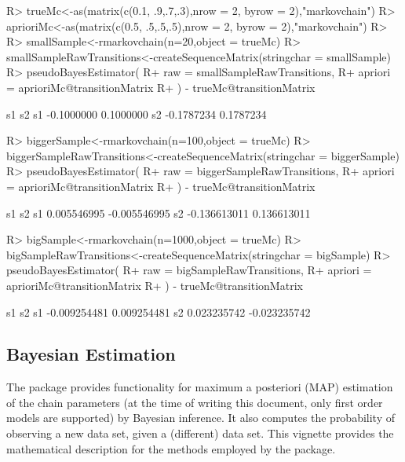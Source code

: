 \documentclass[
  nojss]{jss}
\begin{document}
\begin{CodeChunk}

\begin{CodeInput}
R> trueMc<-as(matrix(c(0.1, .9,.7,.3),nrow = 2, byrow = 2),"markovchain")
R> aprioriMc<-as(matrix(c(0.5, .5,.5,.5),nrow = 2, byrow = 2),"markovchain")
R> 
R> smallSample<-rmarkovchain(n=20,object = trueMc)
R> smallSampleRawTransitions<-createSequenceMatrix(stringchar = smallSample)
R> pseudoBayesEstimator(
R+   raw = smallSampleRawTransitions, 
R+   apriori = aprioriMc@transitionMatrix
R+ ) - trueMc@transitionMatrix
\end{CodeInput}

\begin{CodeOutput}
           s1        s2
s1 -0.1000000 0.1000000
s2 -0.1787234 0.1787234
\end{CodeOutput}

\begin{CodeInput}
R> biggerSample<-rmarkovchain(n=100,object = trueMc)
R> biggerSampleRawTransitions<-createSequenceMatrix(stringchar = biggerSample)
R> pseudoBayesEstimator(
R+   raw = biggerSampleRawTransitions,
R+   apriori = aprioriMc@transitionMatrix
R+ ) - trueMc@transitionMatrix
\end{CodeInput}

\begin{CodeOutput}
             s1           s2
s1  0.005546995 -0.005546995
s2 -0.136613011  0.136613011
\end{CodeOutput}

\begin{CodeInput}
R> bigSample<-rmarkovchain(n=1000,object = trueMc)
R> bigSampleRawTransitions<-createSequenceMatrix(stringchar = bigSample)
R> pseudoBayesEstimator(
R+   raw = bigSampleRawTransitions,
R+   apriori = aprioriMc@transitionMatrix
R+ ) - trueMc@transitionMatrix
\end{CodeInput}

\begin{CodeOutput}
             s1           s2
s1 -0.009254481  0.009254481
s2  0.023235742 -0.023235742
\end{CodeOutput}
\end{CodeChunk}

\hypertarget{bayesian-estimation}{%
\subsection{Bayesian Estimation}\label{bayesian-estimation}}

The  package provides functionality for maximum a posteriori (MAP) estimation of the chain parameters (at the time of writing this document, only first order models are supported) by Bayesian inference. It also computes the probability of observing a new data set, given a (different) data set. This vignette provides the mathematical description for the methods employed by the package.
\end{document}
